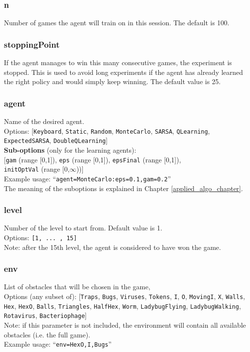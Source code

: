 \subsubsection*{n}
\label{opt:n}
Number of games the agent will train on in this session. The default is 100.

\subsubsection*{stoppingPoint}
\label{opt:stoppingPoint}
If the agent manages to win this many consecutive games, the experiment is stopped. This is used to avoid long experiments if the agent has already learned the right policy and would simply keep winning. The default value is 25.

\subsubsection*{agent}
\label{opt:agent}
Name of the desired agent. \\
Options: [\texttt{Keyboard}, \texttt{Static}, \texttt{Random}, \texttt{MonteCarlo}, \texttt{SARSA}, \texttt{QLearning}, \\ \texttt{ExpectedSARSA}, \texttt{DoubleQLearning}]\\
\textbf{Sub-options} (only for the learning agents):\\
$[$\texttt{gam} (range [0,1]), \texttt{eps} (range [0,1]), \texttt{epsFinal} (range [0,1]), \\ \texttt{initOptVal} (range [0,$\infty$))$]$\\
Example usage: ``\texttt{agent=MonteCarlo:eps=0.1,gam=0.2}''\\
The meaning of the suboptions is explained in Chapter \ref{applied_algo_chapter}.

\subsubsection*{level}
\label{opt:level}
Number of the level to start from. Default value is 1.\\
Options: \texttt{[1, ... , 15]}\\
Note: after the 15th level, the agent is considered to have won the game.

\subsubsection*{env}
\label{opt:env}
List of obstacles that will be chosen in the game,\\
Options (any subset of): [\texttt{Traps}, \texttt{Bugs}, \texttt{Viruses}, \texttt{Tokens},
\texttt{I}, \texttt{O}, \texttt{MovingI}, \texttt{X}, \texttt{Walls}, \texttt{Hex},
\texttt{HexO}, \texttt{Balls}, \texttt{Triangles}, \texttt{HalfHex},
\texttt{Worm}, \texttt{LadybugFlying}, \texttt{LadybugWalking},
\texttt{Rotavirus}, \texttt{Bacteriophage}]\\
Note: if this parameter is not included, the environment will contain all available obstacles (i.e. the full game).\\
Example usage: ``\texttt{env=HexO,I,Bugs}''\\

